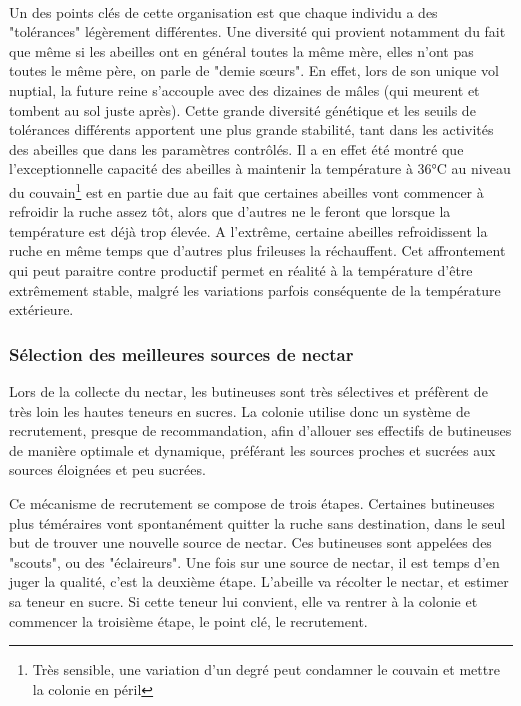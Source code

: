 			\paragraph{}			
			Un des points clés de cette organisation est que chaque individu a des "tolérances" légèrement différentes. Une diversité qui provient notamment du fait que même si les abeilles ont en général toutes la même mère, elles n'ont pas toutes le même père, on parle de "demie sœurs". En effet, lors de son unique vol nuptial, la future reine s'accouple avec des dizaines de mâles (qui meurent et tombent au sol juste après). Cette grande diversité génétique et les seuils de tolérances différents apportent une plus grande stabilité, tant dans les activités des abeilles que dans les paramètres contrôlés. Il a en effet été montré que l'exceptionnelle capacité des abeilles à maintenir la température à 36°C au niveau du couvain\footnote{Très sensible, une variation d'un degré peut condamner le couvain et mettre la colonie en péril} est en partie due au fait que certaines abeilles vont commencer à refroidir la ruche assez tôt, alors que d'autres ne le feront que lorsque la température est déjà trop élevée. A l'extrême, certaine abeilles refroidissent la ruche en même temps que d'autres plus frileuses la réchauffent. Cet affrontement qui peut paraitre contre productif permet en réalité à la température d'être extrêmement stable, malgré les variations parfois conséquente de la température extérieure.
			
			\subsubsection{Sélection des meilleures sources de nectar}
			Lors de la collecte du nectar, les butineuses sont très sélectives et préfèrent de très loin les hautes teneurs en sucres. La colonie utilise donc un système de recrutement, presque de recommandation, afin d'allouer ses effectifs de butineuses de manière optimale et dynamique, préférant les sources proches et sucrées aux sources éloignées et peu sucrées.
			
			Ce mécanisme de recrutement se compose de trois étapes. Certaines butineuses plus téméraires vont spontanément quitter la ruche sans destination, dans le seul but de trouver une nouvelle source de nectar. Ces butineuses sont appelées des "scouts", ou des "éclaireurs". Une fois sur une source de nectar, il est temps d'en juger la qualité, c'est la deuxième étape. L'abeille va récolter le nectar, et estimer sa teneur en sucre. Si cette teneur lui convient, elle va rentrer à la colonie et commencer la troisième étape, le point clé, le recrutement.
			
